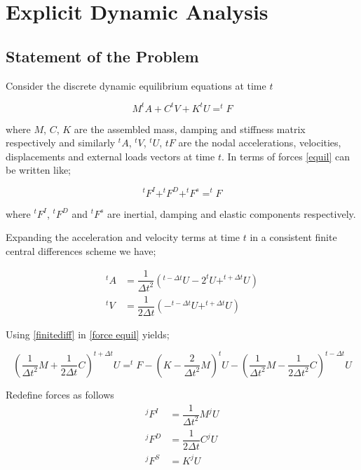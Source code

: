 %
\chapter{Explicit Dynamic Analysis}

\section{Statement of the Problem}
Consider the discrete dynamic equilibrium equations at time $t$

\begin{equation}
M^{t}A+C^{t}V+K^{t}U=^{t}F
\label{equil}
\end{equation}

where $M$, $C$, $K$ are the assembled mass, damping and stiffness matrix respectively and similarly $^{t}A$, $^{t}V$, $^{t}U$, ${t}F$ are the nodal accelerations, velocities, displacements and external loads vectors at time $t$. In terms of forces \eqref{equil} can be written like;

\begin{equation}
^{t}F^I+^{t}F^D+^{t}F^s=^{t}F
\label{force equil}
\end{equation}

where $^{t}F^I$, $^{t}F^D$ and $^{t}F^s$ are inertial, damping and elastic components respectively.

Expanding the acceleration and velocity terms at time $t$ in a consistent finite central differences scheme we have;

\begin{equation}
\begin{aligned}
^{t}A&=\dfrac{1}{\Delta t^2}\left(^{t-\Delta t}U-2^{t}U+^{t+\Delta t}U\right)\\
^{t}V&=\dfrac{1}{2\Delta t}\left(-^{t-\Delta t}U+^{t+\Delta t}U\right)
\end{aligned}
\label{finitediff}
\end{equation}

Using \eqref{finitediff} in \eqref{force equil} yields;


\begin{equation}
\left(\dfrac{1}{\Delta t^2}M+\dfrac{1}{2\Delta t}C\right) ^{t+\Delta t}U=^{t}F-\left(K-\dfrac{2}{\Delta t^2}M\right) ^{t}U-\left(\dfrac{1}{\Delta t^2}M-\dfrac{1}{2\Delta t^2}C\right)^{t-\Delta t}U
\label{resequil}
\end{equation}

Redefine forces as follows
\begin{equation}
\begin{aligned}
^{j}F^I&=\dfrac{1}{\Delta t^2}M ^{j}U\\
^{j}F^D&=\dfrac{1}{2 \Delta t}C ^{j}U\\
^{j}F^S&=K ^{j}U
\end{aligned}
\label{redefine}
\end{equation}

